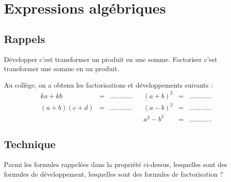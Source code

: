 



\fancyhead{} %

\fancyhead{} %





\chapter{Expressions alg\'ebriques}


 \setcounter{page}{1}

\section{Rappels}

\begin{definition*}
 D\'evelopper c'est transformer un produit en une somme. Factoriser c'est transformer une somme en un produit.
\end{definition*}

\begin{prop*}
Au coll\`ege, on a obtenu les factorisations et d\'eveloppements suivants :
\[\begin{array}{rclcrcl}
 ka+kb & = & \ldots\ldots\ldots\ldots & & (a+b)^2 & = & \ldots\ldots\ldots\ldots\\
 (a+b)(c+d) & = & \ldots\ldots\ldots\ldots & & (a-b)^2 & = & \ldots\ldots\ldots\ldots\\
 &&&&a^2-b^2 & = & \ldots\ldots\ldots\ldots
\end{array}\]
\end{prop*}


\section{Technique}

\begin{exo}
 Parmi les formules rappel\'ees dans la propri\'et\'e ci-dessus, lesquelles sont des formules de d\'eveloppement, lesquelles sont des formules de factorisation ?
\end{exo}





